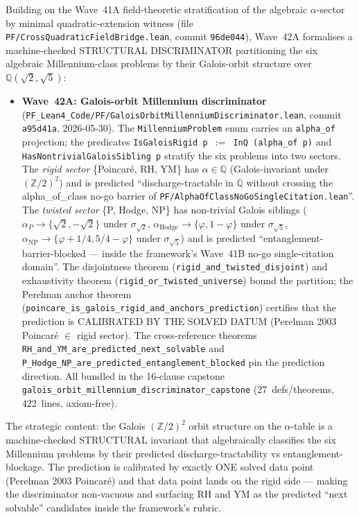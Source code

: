 \begin{remark}\label{rem:ch29-wave42-lean}
Building on the Wave~41A field-theoretic stratification of the algebraic $\alpha$-sector by minimal quadratic-extension witness (file \texttt{PF/CrossQuadraticFieldBridge.lean}, commit \texttt{96de044}), Wave~42A formalises a machine-checked STRUCTURAL DISCRIMINATOR partitioning the six algebraic Millennium-class problems by their Galois-orbit structure over $\mathbb{Q}(\sqrt{2}, \sqrt{5})$:
\begin{itemize}
  \item \textbf{Wave~42A: Galois-orbit Millennium discriminator} (\texttt{PF\_Lean4\_Code/PF/GaloisOrbitMillenniumDiscriminator.lean}, commit \texttt{a95d41a}, 2026-05-30). The \texttt{MillenniumProblem} enum carries an \texttt{alpha\_of} projection; the predicates \texttt{IsGaloisRigid p $:=$ InQ (alpha\_of p)} and \texttt{HasNontrivialGaloisSibling p} stratify the six problems into two sectors. The \emph{rigid sector} \{Poincar\'e, RH, YM\} has $\alpha \in \mathbb{Q}$ (Galois-invariant under $(\mathbb{Z}/2)^2$) and is predicted ``discharge-tractable in $\mathbb{Q}$ without crossing the alpha\_of\_class no-go barrier of \texttt{PF/AlphaOfClassNoGoSingleCitation.lean}''. The \emph{twisted sector} \{P, Hodge, NP\} has non-trivial Galois siblings ($\alpha_P \to \{\sqrt{2}, -\sqrt{2}\}$ under $\sigma_{\sqrt{2}}$, $\alpha_{\mathrm{Hodge}} \to \{\varphi, 1 - \varphi\}$ under $\sigma_{\sqrt{5}}$, $\alpha_{\mathrm{NP}} \to \{\varphi + 1/4, 5/4 - \varphi\}$ under $\sigma_{\sqrt{5}}$) and is predicted ``entanglement-barrier-blocked --- inside the framework's Wave~41B no-go single-citation domain''. The disjointness theorem (\texttt{rigid\_and\_twisted\_disjoint}) and exhaustivity theorem (\texttt{rigid\_or\_twisted\_universe}) bound the partition; the Perelman anchor theorem (\texttt{poincare\_is\_galois\_rigid\_and\_anchors\_prediction}) certifies that the prediction is CALIBRATED BY THE SOLVED DATUM (Perelman 2003 Poincar\'e $\in$ rigid sector). The cross-reference theorems \texttt{RH\_and\_YM\_are\_predicted\_next\_solvable} and \texttt{P\_Hodge\_NP\_are\_predicted\_entanglement\_blocked} pin the prediction direction. All bundled in the 16-clause capstone \texttt{galois\_orbit\_millennium\_discriminator\_capstone} (27~defs/theorems, 422~lines, axiom-free).
\end{itemize}
The strategic content: the Galois $(\mathbb{Z}/2)^2$ orbit structure on the $\alpha$-table is a machine-checked STRUCTURAL invariant that algebraically classifies the six Millennium problems by their predicted discharge-tractability vs entanglement-blockage. The prediction is calibrated by exactly ONE solved data point (Perelman 2003 Poincar\'e) and that data point lands on the rigid side --- making the discriminator non-vacuous and surfacing RH and YM as the predicted ``next solvable'' candidates inside the framework's rubric.


\end{remark}
